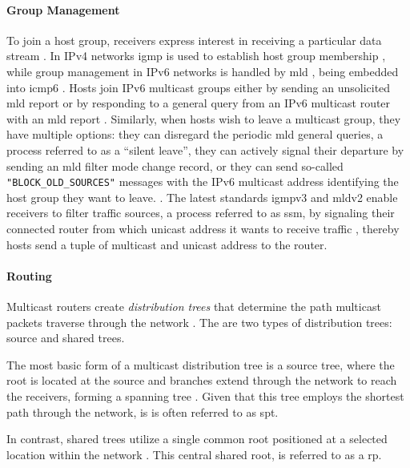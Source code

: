 \paragraph{Group Management} %
\label{par:Group Management}
To join a host group, receivers express interest in receiving a particular data
    stream \cite{cisco_ipmc}.
In IPv4 networks \gls{igmp} is used to establish host group membership
    \cite{rfc3376_igmp}, while group management in IPv6 networks is handled by
    \gls{mld} \cite{rfc3810_mld}, being embedded into \gls{icmp6}
    \cite{rfc4443_icmp6}.
Hosts join IPv6 multicast groups either by sending an unsolicited \gls{mld}
    report or by responding to a general query from an IPv6 multicast router
    with an \gls{mld} report \cite{cisco_mld_snoop}.
Similarly, when hosts wish to leave a multicast group, they have multiple
    options:
    they can disregard the periodic \gls{mld} general queries, a process
        referred to as a ``silent leave'',
    they can actively signal their departure by sending an \gls{mld} filter
        mode change record, or
    they can send so-called \texttt{"BLOCK\_OLD\_SOURCES"} messages with the
    IPv6 multicast address identifying the host group they want to leave.
    \cite{cisco_mld_snoop}.
The latest standards \gls{igmp}v3 and \gls{mld}v2 enable receivers to filter
    traffic sources, a process referred to as \gls{ssm}, by signaling their
    connected router from which unicast address it wants to receive traffic
    \cite{cisco_ipmc}, thereby hosts send a tuple of multicast and unicast
    address to the router.

\paragraph{Routing} %
\label{par:Routing}
Multicast routers create \textit{distribution trees} that determine the path
    multicast packets traverse through the network \cite{cisco_ipmc}.
The are two types of distribution trees: source and shared trees.

The most basic form of a multicast distribution tree is a source tree, where
    the root is located at the source and branches extend through the network
    to reach the receivers, forming a spanning tree \cite{cisco_ipmc}.
Given that this tree employs the shortest path through the network, is is
    often referred to as \gls{spt}.

In contrast, shared trees utilize a single common root positioned at a selected
    location within the network \cite{cisco_ipmc}.
This central shared root, is referred to as a \gls{rp}.

